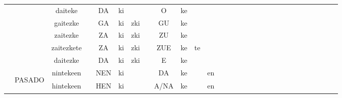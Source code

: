 \documentclass[10pt, a3paper, landscape]{article}
\begin{document}
\begin{table}
\begin{tabular}{|c|c|c|ccccccccc|c|c|cccccccc|ccccccc|}
                              &                                     & daiteke              &    & DA  & ki                        &     &    & O    & ke &    &                      & \multicolumn{1}{c}{} &                      &    &     &    &   &    &     &      &                      &    &     &        &           &    &     &                       \\
                              &                                     & gaitezke             &    & GA  & ki                        & zki &    & GU   & ke &    &                      & \multicolumn{1}{c}{} &                      &    &     &    &   &    &     &      &                      &    &     &        &           &    &     &                       \\
                              &                                     & zaitezke             &    & ZA  & ki                        & zki &    & ZU   & ke &    &                      & \multicolumn{1}{c}{} &                      &    &     &    &   &    &     &      &                      &    &     &        &           &    &     &                       \\
                              &                                     & zaitezkete           &    & ZA  & ki                        & zki &    & ZUE  & ke & te &                      & \multicolumn{1}{c}{} &                      &    &     &    &   &    &     &      &                      &    &     &        &           &    &     &                       \\
                              &                                     & daitezke             &    & DA  & ki                        & zki &    & E    & ke &    &                      & \multicolumn{1}{c}{} &                      &    &     &    &   &    &     &      &                      &    &     &        &           &    &     &                       \\ 
\cline{2-29}
                              & \multirow{7}{*}{\begin{sideways}PASADO\end{sideways}}             & nintekeen            &    & NEN & ki                        &     &    & DA   & ke &    & en                   &                      &                      &    &     &    &   &    &     &      &                      &    &     &        &           &    &     &                       \\
                              &                                     & hintekeen            &    & HEN & ki                        &     &    & A/NA & ke &    & en                   &                      &                      &    &     &    &   &    &     &      &                      &    &     &        &           &    &     &                       \\

\end{tabular}
\end{table}
\end{document}
